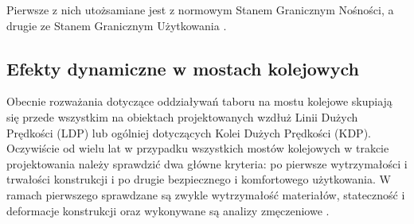 Pierwsze z nich utożsamiane jest z normowym Stanem Granicznym Nośności, a drugie ze Stanem Granicznym Użytkowania \parencite{PolskiKomitetNormalizacyjny2004}. 


\subsection{Efekty dynamiczne w mostach kolejowych}
Obecnie rozważania dotyczące oddziaływań taboru na mostu kolejowe skupiają się przede wszystkim na obiektach projektowanych wzdłuż Linii Dużych Prędkości (LDP) lub ogólniej dotyczących Kolei Dużych Prędkości (KDP). Oczywiście od wielu lat w przypadku wszystkich mostów kolejowych w trakcie projektowania należy sprawdzić dwa główne kryteria: po pierwsze wytrzymałości i trwałości konstrukcji i po drugie bezpiecznego i komfortowego użytkowania. W ramach pierwszego sprawdzane są zwykle wytrzymałość materiałów, stateczność i deformacje konstrukcji oraz wykonywane są analizy zmęczeniowe \parencite{Ladislav2008}.

